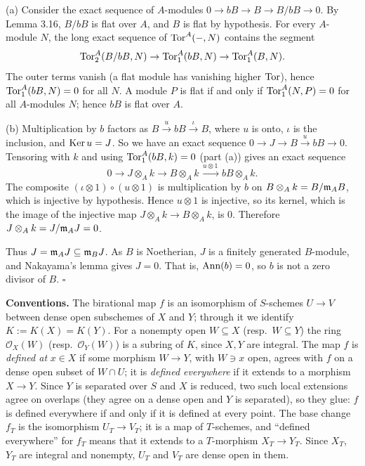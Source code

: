 \documentclass[11pt]{article}
\begin{document}
(a) Consider the exact sequence of $A$-modules $0\to bB\to B\to B/bB\to0$. By Lemma 3.16, $B/bB$ is flat over $A$, and $B$ is flat by hypothesis. For every $A$-module $N$, the long exact sequence of $\operatorname{Tor}^A(-,N)$ contains the segment
\[ \operatorname{Tor}_2^A(B/bB,N)\to\operatorname{Tor}_1^A(bB,N)\to\operatorname{Tor}_1^A(B,N). \]
The outer terms vanish (a flat module has vanishing higher $\operatorname{Tor}$), hence $\operatorname{Tor}_1^A(bB,N)=0$ for all $N$. A module $P$ is flat if and only if $\operatorname{Tor}_1^A(N,P)=0$ for all $A$-modules $N$; hence $bB$ is flat over $A$.

(b) Multiplication by $b$ factors as $B\xrightarrow{\,u\,}bB\xrightarrow{\,\iota\,}B$, where $u$ is onto, $\iota$ is the inclusion, and $\operatorname{Ker} u=J$. So we have an exact sequence $0\to J\to B\xrightarrow{u}bB\to0$. Tensoring with $k$ and using $\operatorname{Tor}_1^A(bB,k)=0$ (part (a)) gives an exact sequence
\[ 0\to J\otimes_Ak\to B\otimes_Ak\xrightarrow{\,u\otimes 1\,}bB\otimes_Ak. \]
The composite $(\iota\otimes1)\circ(u\otimes1)$ is multiplication by $b$ on $B\otimes_Ak=B/\mathfrak m_AB$, which is injective by hypothesis. Hence $u\otimes1$ is injective, so its kernel, which is the image of the injective map $J\otimes_Ak\to B\otimes_Ak$, is $0$. Therefore $J\otimes_Ak=J/\mathfrak m_AJ=0$.

Thus $J=\mathfrak m_AJ\subseteq\mathfrak m_BJ$. As $B$ is Noetherian, $J$ is a finitely generated $B$-module, and Nakayama's lemma gives $J=0$. That is, $\operatorname{Ann}(b)=0$, so $b$ is not a zero divisor of $B$. \hfill$\square$

\pf
\textbf{Conventions.} The birational map $f$ is an isomorphism of $S$-schemes $U\to V$ between dense open subschemes of $X$ and $Y$; through it we identify $K:=K(X)=K(Y)$. For a nonempty open $W\subseteq X$ (resp.\ $W\subseteq Y$) the ring $\mathcal O_X(W)$ (resp.\ $\mathcal O_Y(W)$) is a subring of $K$, since $X,Y$ are integral. The map $f$ is \emph{defined at} $x\in X$ if some morphism $W\to Y$, with $W\ni x$ open, agrees with $f$ on a dense open subset of $W\cap U$; it is \emph{defined everywhere} if it extends to a morphism $X\to Y$. Since $Y$ is separated over $S$ and $X$ is reduced, two such local extensions agree on overlaps (they agree on a dense open and $Y$ is separated), so they glue: $f$ is defined everywhere if and only if it is defined at every point. The base change $f_T$ is the isomorphism $U_T\to V_T$; it is a map of $T$-schemes, and ``defined everywhere'' for $f_T$ means that it extends to a $T$-morphism $X_T\to Y_T$. Since $X_T$, $Y_T$ are integral and nonempty, $U_T$ and $V_T$ are dense open in them.
\end{document}
